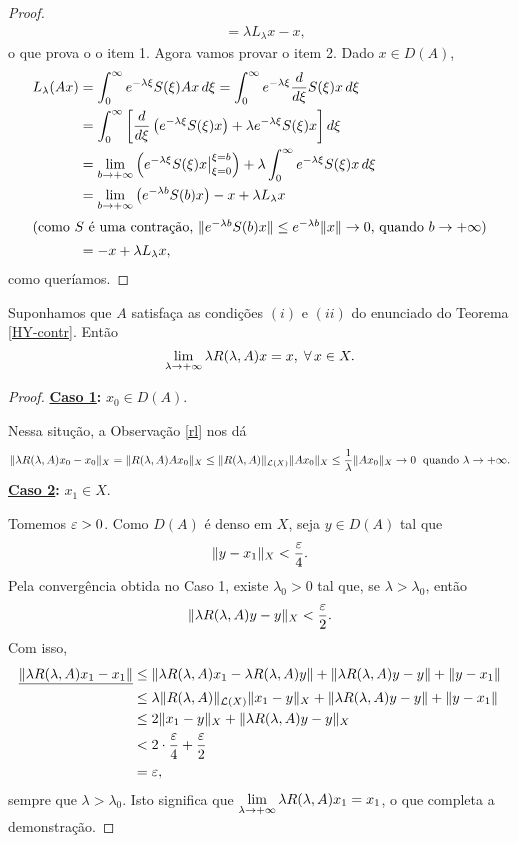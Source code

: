 \begin{proof}
\begin{align*}
& =\lambda
L_\lambda x-x,
\end{align*}
o que prova o o item 1. Agora vamos provar o item 2. Dado $x\in D(A)$, 
\begin{align*}
L_\lambda(Ax)& =\int_0^{\infty}e^{-\lambda
 \xi}S(\xi)Ax\,d\xi=\int_0^{\infty}e^{-\lambda
 \xi}\frac{d}{d\xi}S(\xi)x\,d\xi\\
& =\int_0^{\infty} \bigg[ \frac{d}{d\xi}\left(e^{-\lambda
 \xi}S(\xi)x\right)+\lambda e^{-\lambda
 \xi}S(\xi)x \bigg]\,d\xi\\
& =\lim_{b\to +\infty}\left(e^{-\lambda
 \xi}S(\xi)x\big\vert_{\xi=0}^{\xi=b}\right)+\lambda \int_0^{\infty}e^{-\lambda
 \xi}S(\xi)x \,d\xi\\
& =\lim_{b\to +\infty}\left(e^{-\lambda
 b}S(b)x\right)-x+\lambda L_\lambda x\\
\shortintertext{(como $S$ é uma contração, $\|e^{-\lambda b}S(b)x\|\leq e^{-\lambda b}\|x\|\to 0$, quando $b\to +\infty$)}
& =-x+\lambda L_\lambda x,
\end{align*}
como queríamos.
\end{proof}

\begin{lemma}\label{ap} Suponhamos que $A$ satisfaça as condições $(i)$ e $(ii)$ do enunciado do Teorema \ref{HY-contr}. Então
\begin{equation*}
\lim_{\lambda \to +\infty} \lambda R(\lambda,A) x=x, \; \forall\,x\in X.
\end{equation*}
\end{lemma}
\begin{proof}
\noindent \textbf{\underline{Caso 1}:} $x_0 \in D(A)$.

Nessa situção, a Observação \ref{rl} nos dá
\begin{equation*}
\|\lambda R(\lambda,A) x_0 -x_0\|_X =\|R(\lambda,A) Ax_0 \|_{X}
\leq \| R(\lambda,A) \|_{\mathcal L (X)} \|Ax_0 \|_{X}
\leq \frac{1}{\lambda}\|Ax_0 \|_{X}\to 0\; 
\text{ quando } \lambda\to +\infty.
\end{equation*}
\noindent \textbf{\underline{Caso 2}:} $x_1 \in X$.

Tomemos $\varepsilon >0$. Como $D(A)$ é denso em $X$, seja $y\in D(A)$ tal que
\[\|y-x_1 \|_X < \frac{\varepsilon}{4}.\]
Pela convergência obtida no Caso 1, existe $\lambda_0>0$ tal que, se
$\lambda >\lambda_0$, então
\begin{equation*}
\|\lambda R(\lambda,A) y-y\|_X < \frac{\varepsilon}{2}.
\end{equation*}
Com isso, 
\begin{align*}
\underline{\|\lambda R(\lambda,A) x_1-x_1\|}& \leq \|\lambda R(\lambda,A) x_1 -\lambda R(\lambda,A) y\|
+\|\lambda R(\lambda,A) y-y\|+\|y-x_1 \|\\
&\leq \lambda \|R(\lambda,A) \|_{\mathcal L (X)} \|x_1 -y\|_{X} +\|\lambda R(\lambda,A) y-y\|+\|y-x_1 \|  \\ 
&\leq 2\|x_1 -y\|_{X} +\|\lambda R(\lambda,A) y-y\|_X  \\ 
&< 2\cdot \frac{\varepsilon}{4} +\frac{\varepsilon}{2} \\
&=\varepsilon ,
\end{align*}
sempre que $\lambda > \lambda _0$. Isto significa que $\displaystyle\lim_{\lambda \to +\infty} \lambda R(\lambda,A) x_1 = x_1$, o que completa a demonstração.
\end{proof}

